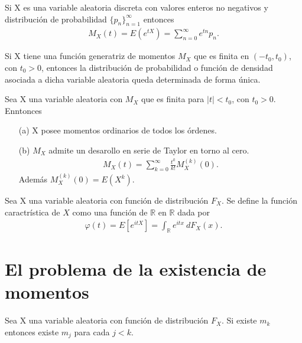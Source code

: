 \begin{obs}
Si X es una variable aleatoria discreta con valores enteros no negativos y distribución de probabilidad $\{p_n\}_{n=1}^{\infty}$ entonces
\begin{align*}
    M_X(t) = E(e^{tX}) = \sum_{n=0}^{\infty}{e^{tn}p_n}.
\end{align*}
\end{obs}

\begin{teo}
Si X tiene una función generatriz de momentos $M_X$ que es finita en $(-t_0, t_0)$, con $t_0 > 0$, entonces la distribución de probabilidad o función de densidad asociada a dicha variable aleatoria queda determinada de forma única.
\end{teo}

\begin{teo}
Sea X una variable aleatoria con $M_X$ que es finita para $|t| < t_0$, con $t_0 > 0$. Enntonces
\begin{enumerate}
    \item[(a)] X posee momentos ordinarios de todos los órdenes.
    \item[(b)] $M_X$ admite un desarollo en serie de Taylor en torno al cero.
    \begin{align*}
        M_X(t) = \sum_{k=0}^{\infty}{\frac{t^k}{k!}M_X^{(k)}(0)}.
    \end{align*}
    Además $M_X^{(k)}(0) = E(X^k)$.
\end{enumerate}
\end{teo}

\begin{defi}
Sea X una variable aleatoria con función de distribución $F_X$. Se define la función caractrística de $X$ como una función de $\mathbb{R}$ en $\mathbb{R}$ dada por
\begin{align*}
    \varphi(t) = E\left[e^{itX}\right] = \int_{\mathbb{R}}{e^{itx} \ dF_X(x)}.
\end{align*}
\end{defi}

\section{El problema de la existencia de momentos}

\begin{teo}
Sea X una variable aleatoria con función de distribución $F_X$. Si existe $m_k$ entonces existe $m_j$ para cada $j < k$.
\end{teo}

